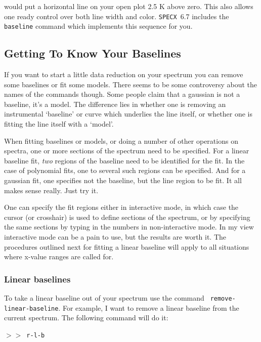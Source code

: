 \documentclass[11pt,twoside]{article}
\newcommand{\SPECX}{{\tt SPECX}}
\newcommand{\SP}{{$>\!>$}}
\begin{document}
would put a horizontal line on your open plot 2.5 K above zero. This
also allows one ready control over both line width and color. \SPECX\
6.7 includes the {\tt baseline} command which implements this sequence
for you.

\subsection{Getting To Know Your Baselines}
\label{sec:specx_5.3}
If you want to start a little data reduction on your spectrum you can
remove some baselines or fit some models.  There seems to be some
controversy about the names of the commands though.  Some people claim
that a gaussian is not a baseline, it's a model. The difference lies
in whether one is removing an instrumental `baseline' or curve which
underlies the line itself, or whether one is fitting the line itself
with a `model'.

When fitting baselines or models, or doing a number of other
operations on spectra, one or more sections of the spectrum need to be
specified. For a linear baseline fit, {\em two} regions of the baseline need
to be identified for the fit. In the case of polynomial fits, one to
several such regions can be specified. And for a gaussian fit, one
specifies not the baseline, but the line region to be fit. It all
makes sense really. Just try it.

One can specify the fit regions either in interactive mode, in which
case the cursor (or crosshair) is used to define sections of the
spectrum, or by specifying the same sections by typing in the numbers
in non-interactive mode.  In my view interactive mode can be a pain to
use, but the results are worth it. The procedures outlined next for
fitting a linear baseline will apply to all situations where x-value
ranges are called for.

\subsubsection{Linear baselines}
\label{sec:linear-baselines}
To take a linear baseline out of your spectrum use the command {\tt
remove-linear-baseline}.  For example, I want to remove a linear
baseline from the current spectrum.  The following command will do
it:

\SP\ \verb|r-l-b|
\end{document}
